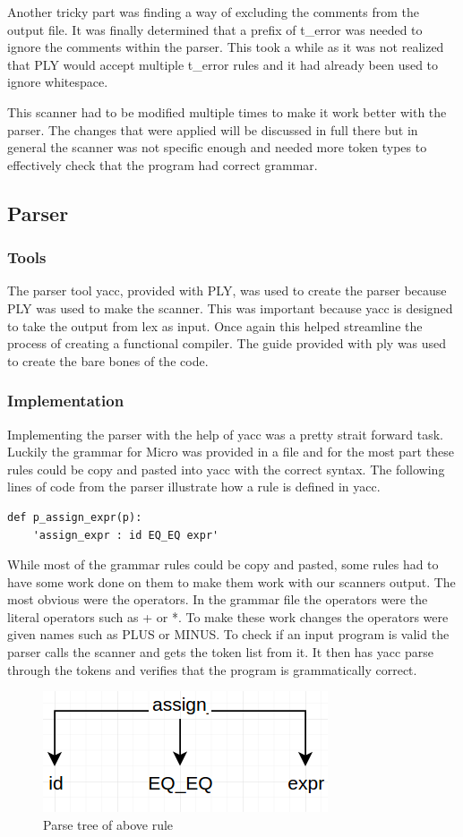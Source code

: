 \documentclass[12pt, oneside]{article}   	%
\begin{document}
Another tricky part was finding a way of excluding the comments from the output file. It was finally determined that a prefix of t\_error was needed to ignore the comments within the parser. This took a while as it was not realized that PLY would accept multiple t\_error rules and it had already been used to ignore whitespace.
 
This scanner had to be modified multiple times to make it work better with the parser. The changes that were applied
will be discussed in full there but in general the scanner was not specific enough and needed more token types to effectively check that the program had correct grammar.
		
		
		
\subsection{Parser}
\subsubsection{Tools}
The parser tool yacc, provided with PLY, was used to create the parser because PLY was used to make the scanner. This was important because yacc is designed to take the output from lex as input. Once again this helped streamline the process of creating a functional compiler.
The guide provided with ply was used to create the bare bones of the code.

\subsubsection{Implementation}
Implementing the parser with the help of yacc was a pretty strait forward task. Luckily the grammar for Micro was provided in a file and  for the most part these rules
could be copy and pasted into yacc with the correct syntax. The following lines of code from the parser illustrate how a rule is defined in yacc.
\begin{lstlisting}
def p_assign_expr(p):
    'assign_expr : id EQ_EQ expr'
\end{lstlisting}

While most of the grammar rules could be copy and pasted, some rules had to have some work done on them
to make them work with our scanners output. The most obvious were the operators. In the grammar file the operators were the literal operators such as + or *. To make these work changes the operators were given names such as PLUS or
MINUS. To check if an input program is valid the parser calls the scanner and gets the token list from it. It then
has yacc parse through the tokens and verifies that the program is grammatically correct.
\begin{figure}[h!]
	\centerline{\includegraphics[width=.4\linewidth]{pics/parse_tree}}
	\caption{Parse tree of above rule}
\end{figure}
\end{document}
